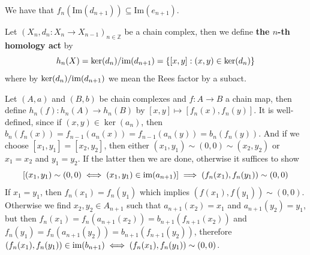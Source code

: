 \begin{remark}
    We have that $f_n(\text{Im}(d_{n+1}))\subseteq\text{Im}(e_{n+1})$.
\end{remark}
\begin{definition}
    Let $(X_n, d_n: X_{n} \to X_{n-1})_{n\in\mathbb{Z}}$ be a chain complex,
    then we define \textbf{the $n$-th homology act} by
    \[
        h_n(X) = \ker(d_{n})/\text{im}(d_{n+1}) = \{[x,y] : (x,y)\in\ker(d_n) \}
    \]
    where by $\ker(d_{n})/\text{im}(d_{n+1})$ we mean the Rees factor by a subact.
\end{definition}
Let $(A,a)$ and $(B,b)$ be chain complexes and $f: A \to B$ a chain map, then define 
$h_n(f): h_n(A) \to h_n(B)$ by $[x,y]\mapsto [f_n(x),f_n(y)]$. It is well-defined, since if 
$(x,y)\in\ker(a_n)$, then $b_n(f_n(x)) = f_{n-1}(a_n(x)) = f_{n-1}(a_n(y)) = b_n(f_n(y))$. And if 
we choose $[x_1,y_1]=[x_2,y_2]$, then either $(x_1,y_1)\sim(0,0)\sim (x_2,y_2)$ or $x_1=x_2$ and 
$y_1=y_2$. If the latter then we are done, otherwise it suffices to show
\[
    \left[(x_1,y_1)\sim (0,0) \iff (x_1,y_1)\in\text{im}(a_{n+1})\right] \implies (f_n(x_1),f_n(y_1))\sim (0,0)
\] 
If $x_1=y_1$, then $f_n(x_1)=f_n(y_1)$ which implies $(f(x_1),f(y_1))\sim (0,0)$. 
Otherwise we find $x_2,y_2\in A_{n+1}$ such that $a_{n+1}(x_2)=x_1$ and $a_{n+1}(y_2)=y_1$, but 
then $f_n(x_1) = f_n(a_{n+1}(x_2)) = b_{n+1}(f_{n+1}(x_2))$ and 
$f_n(y_1) = f_n(a_{n+1}(y_2)) = b_{n+1}(f_{n+1}(y_2))$, therefore 
$(f_n(x_1),f_n(y_1))\in\text{im}(b_{n+1}) \iff (f_n(x_1),f_n(y_1))\sim (0,0)$.

